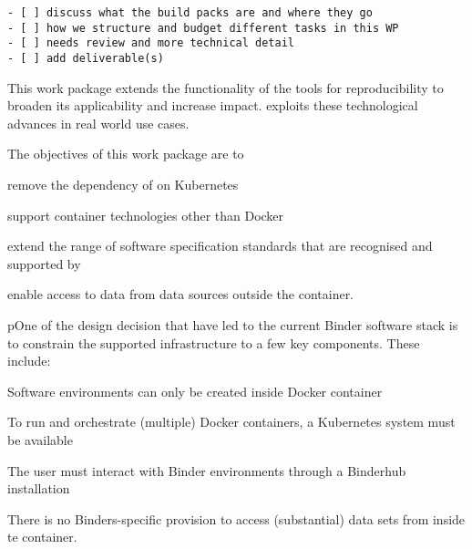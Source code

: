 \begin{draft}
\begin{verbatim}
- [ ] discuss what the build packs are and where they go
- [ ] how we structure and budget different tasks in this WP
- [ ] needs review and more technical detail
- [ ] add deliverable(s)
\end{verbatim}
\end{draft}

\begin{workpackage}[
  id=impact,
  wphases=0-36,
  swsites,
  title=Broadening impact,
  short=Impact,
  lead=SRL,
  SRLRM=27,
  MPRM=18
]
\begin{wpobjectives}
  This work package extends the functionality of the \TheProject tools for
  reproducibility to broaden its applicability and increase impact.
   exploits these technological advances 
  in real world use cases.

  The objectives of this work package are to
 \begin{compactitem}
 \item remove the dependency of \repotodocker{} on Kubernetes
 \item support container technologies other than Docker
 \item {}
 \item extend the range of software specification standards that are recognised
   and supported by \repotodocker{} 
 \item enable access to data from data sources outside the container.
 \end{compactitem}
\end{wpobjectives}

\begin{wpdescription}
pOne of the design decision that have led to the current Binder software stack is
to constrain the supported infrastructure to a few key components. These
include:

\begin{compactitem}
\item Software environments can only be created inside Docker container
\item To run and orchestrate (multiple) Docker containers, a Kubernetes system must
be available
\item The user must interact with Binder environments through a Binderhub
  installation
\item There is no Binders-specific provision to access (substantial) data sets
  from inside te container. 
\end{compactitem}


\end{wpdescription}
\end{workpackage}
